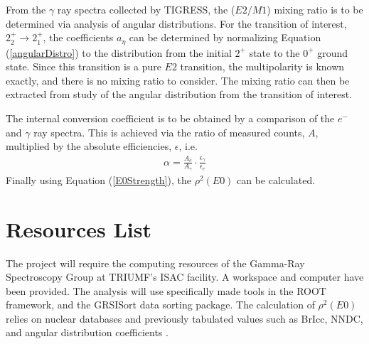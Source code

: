 \documentclass[twocolumn,preprintnumbers,amsmath,amssymb]{revtex4}
\begin{document}

From the $\gamma$ ray spectra collected by TIGRESS, the ($E2/M1$) mixing ratio is to be determined via analysis of angular distributions. For the transition of interest, $2^+_2 \rightarrow 2^+_1$, the coefficients $a_\eta$ can be determined by normalizing Equation (\ref{angularDistro}) to the distribution from the initial $2^+$ state to the $0^+$ ground state. Since this transition is a pure $E2$ transition, the multipolarity is known exactly, and there is no mixing ratio to consider. The mixing ratio can then be extracted from study of the angular distribution from the transition of interest.

The internal conversion coefficient is to be obtained by a comparison of the $e^-$ and $\gamma$ ray spectra. This is achieved via the ratio of measured counts, $A$, multiplied by the absolute efficiencies, $\epsilon$, i.e.
\begin{gather}
\alpha = \frac{A_e}{A_\gamma} \cdot \frac{\epsilon_\gamma}{\epsilon_e}
\label{findICE}
\end{gather}
Finally using Equation (\ref{E0Strength}), the $\rho^2(E0)$ can be calculated. 

\section{Resources List}
The project will require the computing resources of the Gamma-Ray Spectroscopy Group at TRIUMF's ISAC facility. A workspace and computer have been provided. The analysis will use specifically made tools in the ROOT framework, and the GRSISort data sorting package. The calculation of $\rho^2(E0)$ relies on nuclear databases and previously tabulated values such as BrIcc, NNDC, and angular distribution coefficients \cite{evitts_86_BrIcc,evitts_83,NNDC}. 
\vspace{18pt}
\end{document}
